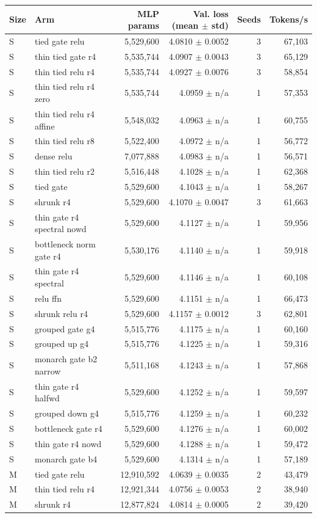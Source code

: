 \begin{tabular}{llrrrr}
\toprule
Size & Arm & MLP params & Val. loss (mean $\pm$ std) & Seeds & Tokens/s \\
\midrule
S & tied gate relu & 5,529,600 & 4.0810 $\pm$ 0.0052 & 3 & 67,103 \\
S & thin tied gate r4 & 5,535,744 & 4.0907 $\pm$ 0.0043 & 3 & 65,129 \\
S & thin tied relu r4 & 5,535,744 & 4.0927 $\pm$ 0.0076 & 3 & 58,854 \\
S & thin tied relu r4 zero & 5,535,744 & 4.0959 $\pm$ n/a & 1 & 57,353 \\
S & thin tied relu r4 affine & 5,548,032 & 4.0963 $\pm$ n/a & 1 & 60,755 \\
S & thin tied relu r8 & 5,522,400 & 4.0972 $\pm$ n/a & 1 & 56,772 \\
S & dense relu & 7,077,888 & 4.0983 $\pm$ n/a & 1 & 56,571 \\
S & thin tied relu r2 & 5,516,448 & 4.1028 $\pm$ n/a & 1 & 62,368 \\
S & tied gate & 5,529,600 & 4.1043 $\pm$ n/a & 1 & 58,267 \\
S & shrunk r4 & 5,529,600 & 4.1070 $\pm$ 0.0047 & 3 & 61,663 \\
S & thin gate r4 spectral nowd & 5,529,600 & 4.1127 $\pm$ n/a & 1 & 59,956 \\
S & bottleneck norm gate r4 & 5,530,176 & 4.1140 $\pm$ n/a & 1 & 59,918 \\
S & thin gate r4 spectral & 5,529,600 & 4.1146 $\pm$ n/a & 1 & 60,108 \\
S & relu ffn & 5,529,600 & 4.1151 $\pm$ n/a & 1 & 66,473 \\
S & shrunk relu r4 & 5,529,600 & 4.1157 $\pm$ 0.0012 & 3 & 62,801 \\
S & grouped gate g4 & 5,515,776 & 4.1175 $\pm$ n/a & 1 & 60,160 \\
S & grouped up g4 & 5,515,776 & 4.1225 $\pm$ n/a & 1 & 59,316 \\
S & monarch gate b2 narrow & 5,511,168 & 4.1243 $\pm$ n/a & 1 & 57,868 \\
S & thin gate r4 halfwd & 5,529,600 & 4.1252 $\pm$ n/a & 1 & 59,597 \\
S & grouped down g4 & 5,515,776 & 4.1259 $\pm$ n/a & 1 & 60,232 \\
S & bottleneck gate r4 & 5,529,600 & 4.1276 $\pm$ n/a & 1 & 60,002 \\
S & thin gate r4 nowd & 5,529,600 & 4.1288 $\pm$ n/a & 1 & 59,472 \\
S & monarch gate b4 & 5,529,600 & 4.1314 $\pm$ n/a & 1 & 57,189 \\
\midrule
M & tied gate relu & 12,910,592 & 4.0639 $\pm$ 0.0035 & 2 & 43,479 \\
M & thin tied relu r4 & 12,921,344 & 4.0756 $\pm$ 0.0053 & 2 & 38,940 \\
M & shrunk r4 & 12,877,824 & 4.0814 $\pm$ 0.0005 & 2 & 39,420 \\
\bottomrule
\end{tabular}
